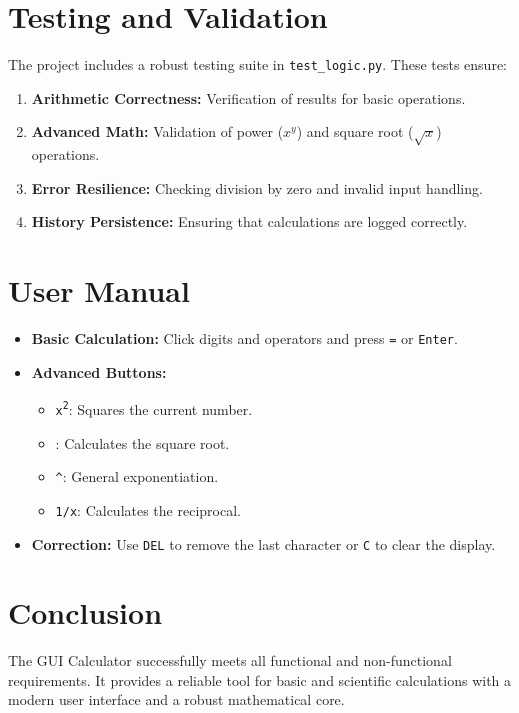 \documentclass[12pt, a4paper]{article}
\begin{document}
\section{Testing and Validation}
The project includes a robust testing suite in \texttt{test\_logic.py}. These tests ensure:
\begin{enumerate}
    \item \textbf{Arithmetic Correctness:} Verification of results for basic operations.
    \item \textbf{Advanced Math:} Validation of power ($x^y$) and square root ($\sqrt{x}$) operations.
    \item \textbf{Error Resilience:} Checking division by zero and invalid input handling.
    \item \textbf{History Persistence:} Ensuring that calculations are logged correctly.
\end{enumerate}

\section{User Manual}
\begin{itemize}
    \item \textbf{Basic Calculation:} Click digits and operators and press \texttt{=} or \texttt{Enter}.
    \item \textbf{Advanced Buttons:}
    \begin{itemize}
        \item \texttt{x\textsuperscript{2}}: Squares the current number.
        \item \texttt{\textsurd}: Calculates the square root.
        \item \texttt{\^}: General exponentiation.
        \item \texttt{1/x}: Calculates the reciprocal.
    \end{itemize}
    \item \textbf{Correction:} Use \texttt{DEL} to remove the last character or \texttt{C} to clear the display.
\end{itemize}

\section{Conclusion}
The GUI Calculator successfully meets all functional and non-functional requirements. It provides a reliable tool for basic and scientific calculations with a modern user interface and a robust mathematical core.
\end{document}
